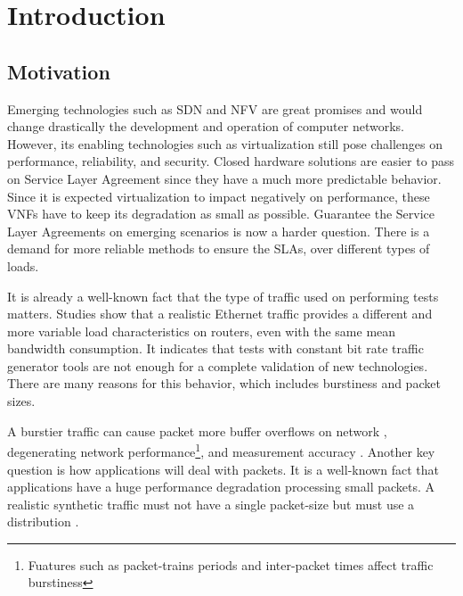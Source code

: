 \chapter{Introduction}\label{ch:introduction}

\section{Motivation}
 

Emerging technologies such as SDN and NFV are great promises and would change drastically the development and operation of computer networks. However, its enabling technologies such as virtualization still pose challenges on performance,  reliability, and security\cite{nfv-challenges}. Closed hardware solutions are easier to pass on Service Layer Agreement since they have a much more predictable behavior. Since it is expected virtualization to impact negatively on performance, these VNFs have to keep its degradation as small as possible. Guarantee the Service Layer Agreements on emerging scenarios is now a harder question. There is a demand for more reliable methods to ensure the SLAs, over different types of loads.


It is already a well-known fact that the type of traffic used on performing tests matters. Studies show that a realistic Ethernet traffic provides a different and more variable load characteristics on routers\cite{harpoon-validation}, even with the same mean bandwidth consumption. It indicates that tests with constant bit rate traffic generator tools are not enough for a complete validation of new technologies. There are many reasons for this behavior, which includes burstiness and packet sizes.


A burstier traffic can cause packet more buffer overflows on network \cite{burstiness-queue-lenght} \cite{modelling-of-self-similar} \cite{empirical-interarrival-study}, degenerating network performance\footnote{Fuatures such as packet-trains periods and inter-packet times affect traffic burstiness}, and  measurement accuracy\cite{legotg-paper} \cite{background-traffic-matter}. Another key question is how applications will deal with packets. It is a well-known fact that applications have a huge performance degradation processing small packets\cite{comparative-trafficgen-tools}. A realistic synthetic traffic must not have a single packet-size but must use a distribution \cite{packet-distribution-model}. 


